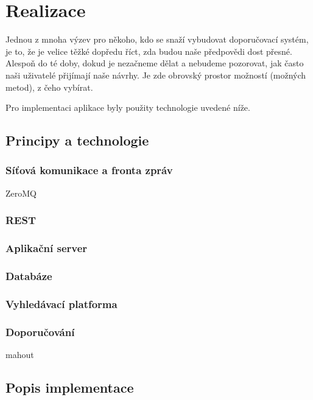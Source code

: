 \documentclass[thesis=M,czech]{FITthesis}[2014/05/07]
\begin{document}
\chapter{Realizace}
\label{chap:impl}

Jednou z mnoha výzev pro někoho, kdo se snaží vybudovat doporučovací systém, je to, že je velice těžké dopředu říct, zda budou naše předpovědi dost přesné. Alespoň do té doby, dokud je nezačneme dělat a nebudeme pozorovat, jak často naši uživatelé přijímají naše návrhy. Je zde obrovský prostor možností (možných metod), z čeho vybírat. 

Pro implementaci aplikace byly použity technologie uvedené níže.

\section{Principy a technologie}
\label{sec:sysanalys}

\subsection{Síťová komunikace a fronta zpráv}
ZeroMQ

\subsection{REST}

\subsection{Aplikační server}

\subsection{Databáze}

\subsection{Vyhledávací platforma}

\subsection{Doporučování}
mahout

\section{Popis implementace}
\label{sec:impl}
\end{document}
